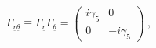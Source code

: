 \begin{equation}
\Gamma_{\underline{r}\underline{\theta}} \equiv \Gamma_{\underline r}
\Gamma_{\underline\theta} = \left(\begin{array}{cc} i\gamma_5 &
0\\[2mm] 0 & -i\gamma_5 \end{array}\right)~,
\end{equation}

